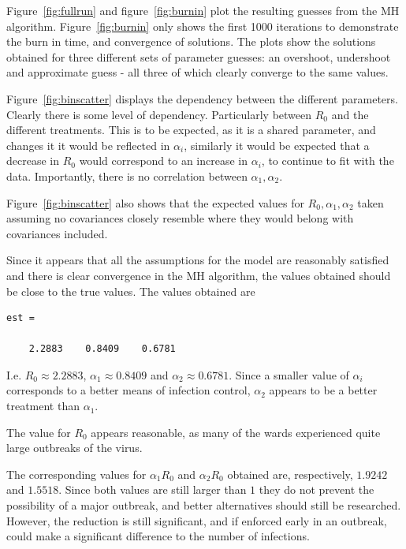 \documentclass{X:/Documents/Coding/Latex/myassignment}
\begin{document}
Figure~\ref{fig:fullrun} and figure~\ref{fig:burnin} plot the resulting guesses from the MH algorithm. Figure~\ref{fig:burnin} only shows the first 1000 iterations to demonstrate the burn in time, and convergence of solutions. The plots show the solutions obtained for three different sets of parameter guesses: an overshoot, undershoot and approximate guess - all three of which clearly converge to the same values.


Figure~\ref{fig:binscatter} displays the dependency between the different parameters. Clearly there is some level of dependency. Particularly between $R_0$ and the different treatments. This is to be expected, as it is a shared parameter, and changes it it would be reflected in $\alpha_i$, similarly it would be expected that a decrease in $R_0$ would correspond to an increase in $\alpha_i$, to continue to fit with the data. Importantly, there is no correlation between $\alpha_1, \alpha_2$.

Figure~\ref{fig:binscatter} also shows that the expected values for $R_0,\alpha_1,\alpha_2$ taken assuming no covariances closely resemble where they would belong with covariances included.

Since it appears that all the assumptions for the model are reasonably satisfied and there is clear convergence in the MH algorithm, the values obtained should be close to the true values. The values obtained are
\begin{verbatim}
est =

    2.2883    0.8409    0.6781
\end{verbatim} 
I.e. $R_0 \approx 2.2883$, $\alpha_1 \approx 0.8409$ and $\alpha_2 \approx 0.6781$. Since a smaller value of $\alpha_i$ corresponds to a better means of infection control, $\alpha_2$ appears to be a better treatment than $\alpha_1$. 

The value for $R_0$ appears reasonable, as many of the wards experienced quite large outbreaks of the virus.

The corresponding values for $\alpha_1 R_0$ and $\alpha_2 R_0$ obtained are, respectively, $1.9242$ and $1.5518$. Since both values are still larger than $1$ they do not prevent the possibility of a major outbreak, and better alternatives should still be researched. However, the reduction is still significant, and if enforced early in an outbreak, could make a significant difference to the number of infections.
\end{document}
